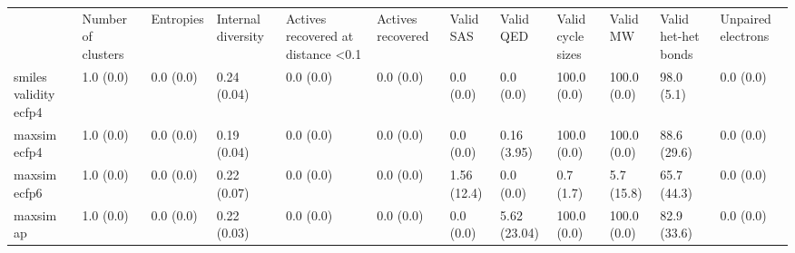 \begin{tabular}{llllllllllll}
 & Number of clusters & Entropies & Internal diversity & Actives recovered at distance <0.1 & Actives recovered & Valid SAS & Valid QED & Valid cycle sizes & Valid MW & Valid het-het bonds & Unpaired electrons \\
smiles validity ecfp4 & {\cellcolor[HTML]{F6FCFD}} \color[HTML]{000000} 1.0 (0.0) & {\cellcolor[HTML]{F7FCFD}} \color[HTML]{000000} 0.0 (0.0) & {\cellcolor[HTML]{68C3A6}} \color[HTML]{000000} 0.24 (0.04) & {\cellcolor[HTML]{F7FCFD}} \color[HTML]{000000} 0.0 (0.0) & {\cellcolor[HTML]{F7FCFD}} \color[HTML]{000000} 0.0 (0.0) & {\cellcolor[HTML]{F7FCFD}} \color[HTML]{000000} 0.0 (0.0) & {\cellcolor[HTML]{F7FCFD}} \color[HTML]{000000} 0.0 (0.0) & {\cellcolor[HTML]{C8EBE4}} \color[HTML]{000000} 100.0 (0.0) & {\cellcolor[HTML]{EBF7FA}} \color[HTML]{000000} 100.0 (0.0) & {\cellcolor[HTML]{9DDACB}} \color[HTML]{000000} 98.0 (5.1) & {\cellcolor[HTML]{F7FCFD}} \color[HTML]{000000} 0.0 (0.0) \\
maxsim ecfp4 & {\cellcolor[HTML]{F6FCFD}} \color[HTML]{000000} 1.0 (0.0) & {\cellcolor[HTML]{F7FCFD}} \color[HTML]{000000} 0.0 (0.0) & {\cellcolor[HTML]{70C6AC}} \color[HTML]{000000} 0.19 (0.04) & {\cellcolor[HTML]{F7FCFD}} \color[HTML]{000000} 0.0 (0.0) & {\cellcolor[HTML]{F7FCFD}} \color[HTML]{000000} 0.0 (0.0) & {\cellcolor[HTML]{F7FCFD}} \color[HTML]{000000} 0.0 (0.0) & {\cellcolor[HTML]{F7FCFD}} \color[HTML]{000000} 0.16 (3.95) & {\cellcolor[HTML]{D6F0EE}} \color[HTML]{000000} 100.0 (0.0) & {\cellcolor[HTML]{EDF8FB}} \color[HTML]{000000} 100.0 (0.0) & {\cellcolor[HTML]{E6F5F9}} \color[HTML]{000000} 88.6 (29.6) & {\cellcolor[HTML]{D6F0EE}} \color[HTML]{000000} 0.0 (0.0) \\
maxsim ecfp6 & {\cellcolor[HTML]{F6FCFD}} \color[HTML]{000000} 1.0 (0.0) & {\cellcolor[HTML]{F7FCFD}} \color[HTML]{000000} 0.0 (0.0) & {\cellcolor[HTML]{6DC5A9}} \color[HTML]{000000} 0.22 (0.07) & {\cellcolor[HTML]{F7FCFD}} \color[HTML]{000000} 0.0 (0.0) & {\cellcolor[HTML]{F7FCFD}} \color[HTML]{000000} 0.0 (0.0) & {\cellcolor[HTML]{F5FBFC}} \color[HTML]{000000} 1.56 (12.4) & {\cellcolor[HTML]{F7FCFD}} \color[HTML]{000000} 0.0 (0.0) & {\cellcolor[HTML]{D5EFED}} \color[HTML]{000000} 0.7 (1.7) & {\cellcolor[HTML]{EEF8FB}} \color[HTML]{000000} 5.7 (15.8) & {\cellcolor[HTML]{CCECE6}} \color[HTML]{000000} 65.7 (44.3) & {\cellcolor[HTML]{F7FCFD}} \color[HTML]{000000} 0.0 (0.0) \\
maxsim ap & {\cellcolor[HTML]{F6FCFD}} \color[HTML]{000000} 1.0 (0.0) & {\cellcolor[HTML]{F7FCFD}} \color[HTML]{000000} 0.0 (0.0) & {\cellcolor[HTML]{74C8AE}} \color[HTML]{000000} 0.22 (0.03) & {\cellcolor[HTML]{F7FCFD}} \color[HTML]{000000} 0.0 (0.0) & {\cellcolor[HTML]{F7FCFD}} \color[HTML]{000000} 0.0 (0.0) & {\cellcolor[HTML]{F7FCFD}} \color[HTML]{000000} 0.0 (0.0) & {\cellcolor[HTML]{EFF9FB}} \color[HTML]{000000} 5.62 (23.04) & {\cellcolor[HTML]{2F9A59}} \color[HTML]{F1F1F1} 100.0 (0.0) & {\cellcolor[HTML]{F7FCFD}} \color[HTML]{000000} 100.0 (0.0) & {\cellcolor[HTML]{E4F5F8}} \color[HTML]{000000} 82.9 (33.6) & {\cellcolor[HTML]{F7FCFD}} \color[HTML]{000000} 0.0 (0.0) \\

\end{tabular}

